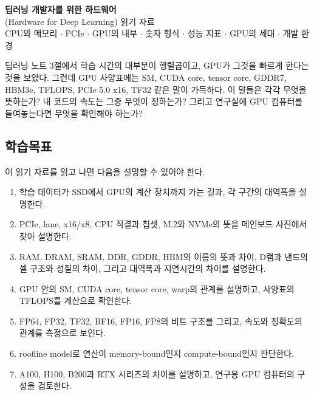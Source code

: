 \documentclass[11pt,a4paper]{article}
\begin{document}

\begin{center}
{\LARGE\bfseries 딥러닝 개발자를 위한 하드웨어}\\[0.3em]
{\large (Hardware for Deep Learning) \quad 읽기 자료}\\[0.5em]
{\normalsize CPU와 메모리 $\cdot$ PCIe $\cdot$ GPU의 내부 $\cdot$ 숫자 형식 $\cdot$ 성능 지표 $\cdot$ GPU의 세대 $\cdot$ 개발 환경}\\[0.8em]
\end{center}

\begin{keybox}[이 읽기 자료의 핵심 질문]
딥러닝 노트 3절에서 학습 시간의 대부분이 행렬곱이고, GPU가 그것을 빠르게 한다는 것을 보았다.
그런데 GPU 사양표에는 SM, CUDA core, tensor core, GDDR7, HBM3e, TFLOPS, PCIe 5.0 x16, TF32 같은 말이 가득하다.
이 말들은 각각 무엇을 뜻하는가? 내 코드의 속도는 그중 무엇이 정하는가?
그리고 연구실에 GPU 컴퓨터를 들여놓는다면 무엇을 확인해야 하는가?
\end{keybox}

\subsection*{학습목표}

이 읽기 자료를 읽고 나면 다음을 설명할 수 있어야 한다.

\begin{enumerate}[label=\arabic*.]
\item 학습 데이터가 SSD에서 GPU의 계산 장치까지 가는 길과, 각 구간의 대역폭을 설명한다.
\item PCIe, lane, x16/x8, CPU 직결과 칩셋, M.2와 NVMe의 뜻을 메인보드 사진에서 찾아 설명한다.
\item RAM, DRAM, SRAM, DDR, GDDR, HBM의 이름의 뜻과 차이, D램과 낸드의 셀 구조와 성질의 차이, 그리고 대역폭과 지연시간의 차이를 설명한다.
\item GPU 안의 SM, CUDA core, tensor core, warp의 관계를 설명하고, 사양표의 TFLOPS를 계산으로 확인한다.
\item FP64, FP32, TF32, BF16, FP16, FP8의 비트 구조를 그리고, 속도와 정확도의 관계를 측정으로 보인다.
\item roofline model로 연산이 memory-bound인지 compute-bound인지 판단한다.
\item A100, H100, B200과 RTX 시리즈의 차이를 설명하고, 연구용 GPU 컴퓨터의 구성을 검토한다.
\end{enumerate}
\end{document}
